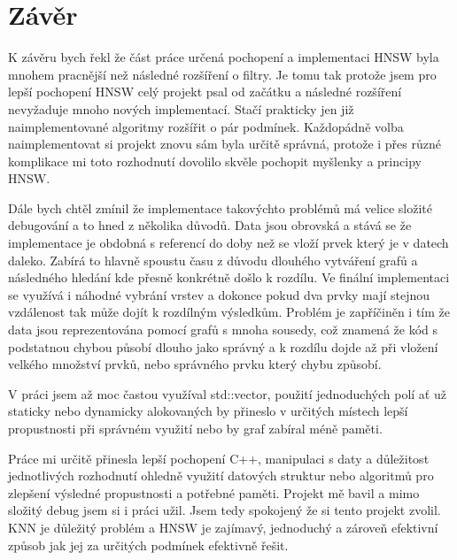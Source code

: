 \documentclass[czech,semestral,dept460,male,csharp,cpdeclaration]{diploma}
\begin{document}
	\chapter{Závěr}
	\label{chap_zaver}
	
		K závěru bych řekl že část práce určená pochopení a implementaci HNSW byla mnohem pracnější než následné rozšíření o filtry. Je tomu tak protože jsem pro lepší pochopení HNSW celý projekt psal od začátku a následné rozšíření nevyžaduje mnoho nových implementací. Stačí prakticky jen již naimplementované algoritmy rozšířit o pár podmínek. Každopádně volba naimplementovat si projekt znovu sám byla určitě správná, protože i přes různé komplikace mi toto rozhodnutí dovolilo skvěle pochopit myšlenky a principy HNSW.
		
		Dále bych chtěl zmínil že implementace takovýchto problémů má velice složité debugování a to hned z několika důvodů. Data jsou obrovská a stává se že implementace je obdobná s referencí do doby než se vloží prvek který je v datech daleko. Zabírá to hlavně spoustu času z důvodu dlouhého vytváření grafů a následného hledání kde přesně konkrétně došlo k rozdílu. Ve finální implementaci se využívá i náhodné vybrání vrstev a dokonce pokud dva prvky mají stejnou vzdálenost tak může dojít k rozdílným výsledkům. Problém je zapříčiněn i tím že data jsou reprezentována pomocí grafů s mnoha sousedy, což znamená že kód s podstatnou chybou působí dlouho jako správný a k rozdílu dojde až při vložení velkého množství prvků, nebo správného prvku který chybu způsobí.
		
		V práci jsem až moc častou využíval std::vector, použití jednoduchých polí ať už staticky nebo dynamicky alokovaných by přineslo v určitých místech lepší propustnosti při správném využití nebo by graf zabíral méně paměti.
		
		Práce mi určitě přinesla lepší pochopení C++, manipulaci s daty a důležitost jednotlivých rozhodnutí ohledně využití datových struktur nebo algoritmů pro zlepšení výsledné propustnosti a potřebné paměti. Projekt mě bavil a mimo složitý debug jsem si i práci užil. Jsem tedy spokojený že si tento projekt zvolil. KNN je důležitý problém a HNSW je zajímavý, jednoduchý a zároveň efektivní způsob jak jej za určitých podmínek efektivně řešit.
	
	\nocite{*}
	
	\printbibliography[title={Literatura}, heading=bibintoc]
	
\end{document}
